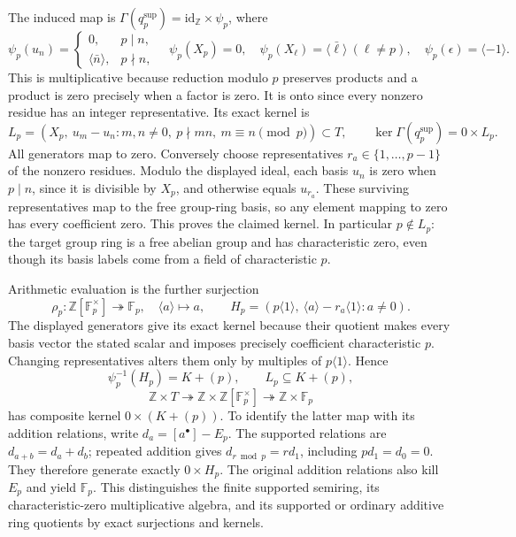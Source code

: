 \documentclass[
  10pt,
]{article}
\begin{document}
The induced map is
\(\Gamma(q_p^{\mathrm{sup}})=\mathrm{id}_{\mathbb Z}\times\psi_p\),
where \[
\psi_p(u_n)=\begin{cases}0,&p\mid n,\\\langle\bar n\rangle,&p\nmid n,\end{cases}
\quad
\psi_p(X_p)=0,\quad\psi_p(X_\ell)=\langle\bar\ell\rangle\ (\ell\ne p),\quad
\psi_p(\epsilon)=\langle-1\rangle.
\tag{TPS49}
\] This is multiplicative because reduction modulo \(p\) preserves
products and a product is zero precisely when a factor is zero. It is
onto since every nonzero residue has an integer representative. Its
exact kernel is \[
L_p=(X_p,\ u_m-u_n:
m,n\ne0,\ p\nmid mn,\ m\equiv n\pmod p)\subset T,
\qquad\ker\Gamma(q_p^{\mathrm{sup}})=0\times L_p.
\tag{TPS50}
\] All generators map to zero. Conversely choose representatives
\(r_a\in\{1,\ldots,p-1\}\) of the nonzero residues. Modulo the displayed
ideal, each basis \(u_n\) is zero when \(p\mid n\), since it is
divisible by \(X_p\), and otherwise equals \(u_{r_a}\). These surviving
representatives map to the free group-ring basis, so any element mapping
to zero has every coefficient zero. This proves the claimed kernel. In
particular \(p\notin L_p\): the target group ring is a free abelian
group and has characteristic zero, even though its basis labels come
from a field of characteristic \(p\).

Arithmetic evaluation is the further surjection \[
\rho_p:\mathbb Z[\mathbb F_p^\times]\twoheadrightarrow\mathbb F_p,
\quad\langle a\rangle\mapsto a,
\qquad
H_p=(p\langle1\rangle,\ \langle a\rangle-r_a\langle1\rangle:a\ne0).
\tag{TPS51}
\] The displayed generators give its exact kernel because their quotient
makes every basis vector the stated scalar and imposes precisely
coefficient characteristic \(p\). Changing representatives alters them
only by multiples of \(p\langle1\rangle\). Hence \[
\psi_p^{-1}(H_p)=K+(p),\qquad L_p\subseteq K+(p),
\] \[
\mathbb Z\times T\twoheadrightarrow
\mathbb Z\times\mathbb Z[\mathbb F_p^\times]\twoheadrightarrow
\mathbb Z\times\mathbb F_p
\tag{TPS52}
\] has composite kernel \(0\times(K+(p))\). To identify the latter map
with its addition relations, write \(d_a=[a^\bullet]-E_p\). The
supported relations are \(d_{a+b}=d_a+d_b\); repeated addition gives
\(d_{r\bmod p}=r d_1\), including \(p d_1=d_0=0\). They therefore
generate exactly \(0\times H_p\). The original addition relations also
kill \(E_p\) and yield \(\mathbb F_p\). This distinguishes the finite
supported semiring, its characteristic-zero multiplicative algebra, and
its supported or ordinary additive ring quotients by exact surjections
and kernels.
\end{document}
